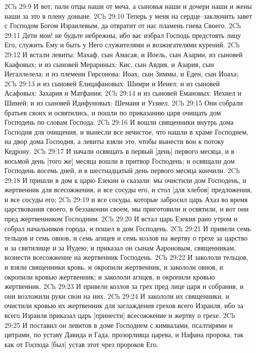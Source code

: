 2Ch 29:9  И вот, пали отцы наши от меча, а сыновья наши и дочери наши и жены наши за это в плену доныне.
2Ch 29:10  Теперь у меня на сердце--заключить завет с Господом Богом Израилевым, да отвратит от нас пламень гнева Своего.
2Ch 29:11  Дети мои! не будьте небрежны, ибо вас избрал Господь предстоять лицу Его, служить Ему и быть у Него служителями и возжигателями курений.
2Ch 29:12  И встали левиты: Махаф, сын Амасая, и Иоель, сын Азарии, из сыновей Каафовых; и из сыновей Мерариных: Кис, сын Авдия, и Азария, сын Иегаллелела; и из племени Гирсонова: Иоах, сын Зиммы, и Еден, сын Иоаха;
2Ch 29:13  и из сыновей Елицафановых: Шимри и Иеиел; и из сыновей Асафовых: Захария и Матфания;
2Ch 29:14  и из сыновей Емановых: Иехиел и Шимей; и из сыновей Идифуновых: Шемаия и Уззиел.
2Ch 29:15  Они собрали братьев своих и освятились, и пошли по приказанию царя очищать дом Господень по словам Господа.
2Ch 29:16  И вошли священники внутрь дома Господня для очищения, и вынесли все нечистое, что нашли в храме Господнем, на двор дома Господня, а левиты взяли это, чтобы вынести вон к потоку Кедрону.
2Ch 29:17  И начали освящать в первый [день] первого месяца, и в восьмой день [того же] месяца вошли в притвор Господень; и освящали дом Господень восемь дней, и в шестнадцатый день первого месяца кончили.
2Ch 29:18  И пришли в дом к царю Езекии и сказали: мы очистили дом Господень, и жертвенник для всесожжения, и все сосуды его, и стол [для хлебов] предложения, и все сосуды его;
2Ch 29:19  и все сосуды, которые забросил царь Ахаз во время царствования своего, в беззаконии своем, мы приготовили и освятили, и вот они пред жертвенником Господним.
2Ch 29:20  И встал царь Езекия рано утром и собрал начальников города, и пошел в дом Господень.
2Ch 29:21  И привели семь тельцов и семь овнов, и семь агнцев и семь козлов на жертву о грехе за царство и за святилище и за Иудею; и приказал он сынам Аароновым, священникам, вознести всесожжение на жертвенник Господень.
2Ch 29:22  И закололи тельцов, и взяли священники кровь, и окропили жертвенник, и закололи овнов, и окропили кровью жертвенник; и закололи агнцев, и окропили кровью жертвенник.
2Ch 29:23  И привели козлов за грех пред лице царя и собрания, и они возложили руки свои на них.
2Ch 29:24  И закололи их священники, и очистили кровью их жертвенник для заглаждения грехов всего Израиля, ибо за всего Израиля приказал царь [принести] всесожжение и жертву о грехе.
2Ch 29:25  И поставил он левитов в доме Господнем с кимвалами, псалтирями и цитрами, по уставу Давида и Гада, прозорливца царева, и Нафана пророка, так как от Господа [был] устав этот чрез пророков Его.
